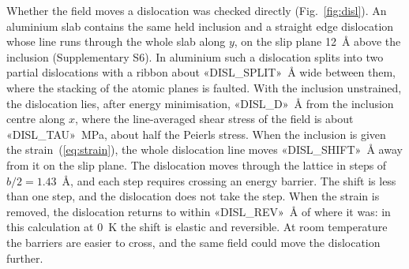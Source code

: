 Whether the field moves a dislocation was checked directly (Fig.~\ref{fig:disl}).
An aluminium slab contains the same held inclusion and a straight edge
dislocation whose line runs through the whole slab along $y$, on the slip
plane 12~\AA{} above the inclusion (Supplementary S6). In aluminium such a
dislocation splits into two partial dislocations with a ribbon about
«DISL_SPLIT»~\AA{} wide between them, where the stacking of the atomic
planes is faulted. With the inclusion unstrained, the dislocation lies,
after energy minimisation, «DISL_D»~\AA{} from the inclusion centre along
$x$, where the line-averaged shear stress of the field is about
«DISL_TAU»~MPa, about half the Peierls stress. When the inclusion is given
the strain~(\ref{eq:strain}), the whole dislocation line moves
«DISL_SHIFT»~\AA{} away from it on the slip plane. The dislocation moves
through the lattice in steps of $b/2=1.43$~\AA, and each step requires
crossing an energy barrier. The shift is less than one step, and the
dislocation does not take the step. When the strain is removed, the
dislocation returns to within «DISL_REV»~\AA{} of where it was: in this
calculation at 0~K the shift is elastic and reversible. At room temperature
the barriers are easier to cross, and the same field could move the
dislocation further.
